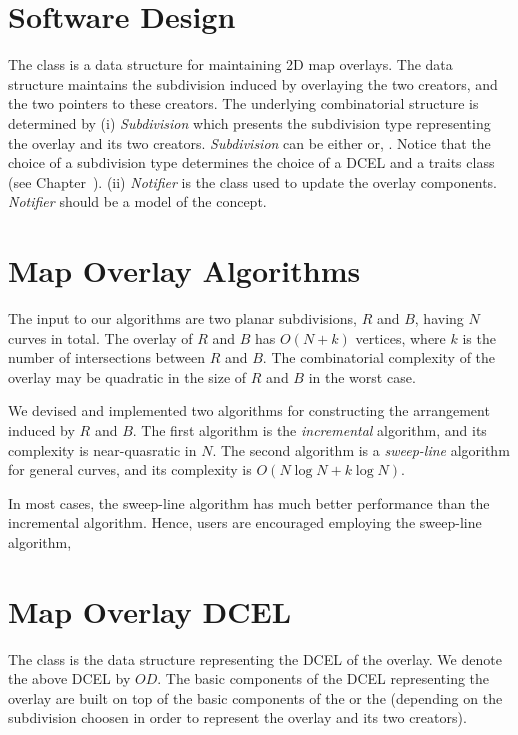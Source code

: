 \begin{ccTexOnly}

\section{Software Design}
The  class 
is a data structure for maintaining 2D map overlays.
The data structure maintains the subdivision induced by overlaying 
the two creators, and the two pointers to these creators. 
The underlying combinatorial structure is determined by
(i) {\it Subdivision} which presents the subdivision type 
representing the overlay and its two creators. 
{\it Subdivision} can be either  or, 
 .
Notice that the choice of a subdivision type determines the choice 
of a DCEL and a traits class (see Chapter~).
(ii) {\it Notifier} is the class used to update the overlay components. 
{\it Notifier} should be a model of the 
 concept.

\section{Map Overlay Algorithms}
\label{sec:algorithms}
The input to our algorithms are two planar subdivisions, 
$R$ and $B$, having $N$ curves in total. 
The overlay of $R$ and $B$ has $O(N+k)$ vertices, 
where $k$ is the number of intersections between $R$ and $B$.
The combinatorial complexity of the overlay may be quadratic 
in the size of $R$ and $B$ in the worst case.

We devised and implemented two algorithms for constructing the 
arrangement induced by $R$ and $B$.
The first algorithm is the {\em incremental} algorithm, 
and its complexity is near-quasratic in $N$. 
The second algorithm is a {\em sweep-line} algorithm 
for general curves, and its complexity is $O(N\log{N} + k\log{N})$.

In most cases, the sweep-line algorithm has much better performance 
than the incremental algorithm. Hence, users are encouraged employing 
the sweep-line algorithm,

\section{Map Overlay DCEL}
\label{sec:dcel}
The 
class is the data structure representing the DCEL of the overlay. 
We denote the above DCEL by $OD$.
The basic components of the DCEL representing the overlay are built 
on top of the basic components of the  or 
the  
(depending on the subdivision choosen in 
order to represent the overlay and its two creators).


\end{ccTexOnly}
